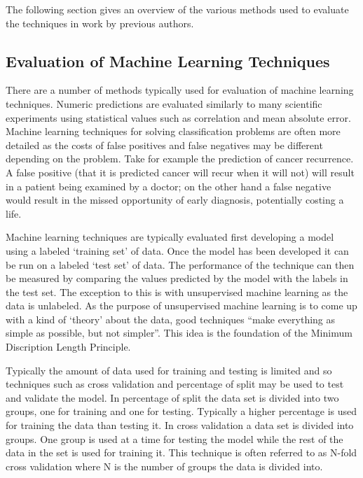 The following section gives an overview of the various methods used to evaluate the techniques in work by previous authors.

\subsection{Evaluation of Machine Learning Techniques}\cite{witten2005data}

There are a number of methods typically used for evaluation of machine learning techniques. Numeric predictions are evaluated similarly to many scientific experiments using statistical values such as correlation and mean absolute error. Machine learning techniques for solving classification problems are often more detailed as the costs of false positives and false negatives may be different depending on the problem. Take for example the prediction of cancer recurrence. A false positive (that it is predicted cancer will recur when it will not) will result in a patient being examined by a doctor; on the other hand a false negative would result in the missed opportunity of early diagnosis, potentially costing a life.

Machine learning techniques are typically evaluated first developing a model using a labeled `training set' of data. Once the model has been developed it can be run on a labeled `test set' of data. The performance of the technique can then be measured by comparing the values predicted by the model with the labels in the test set. The exception to this is with unsupervised machine learning as the data is unlabeled. As the purpose of unsupervised machine learning is to come up with a kind of `theory' about the data, good techniques ``make everything as simple as possible, but not simpler''. This idea is the foundation of the Minimum Discription Length Principle.

Typically the amount of data used for training and testing is limited and so techniques such as cross validation and percentage of split may be used to test and validate the model. In percentage of split the data set is divided into two groups, one for training and one for testing. Typically a higher percentage is used for training the data than testing it. In cross validation a data set is divided into groups. One group is used at a time for testing the model while the rest of the data in the set is used for training it. This technique is often referred to as N-fold cross validation where N is the number of groups the data is divided into. 

